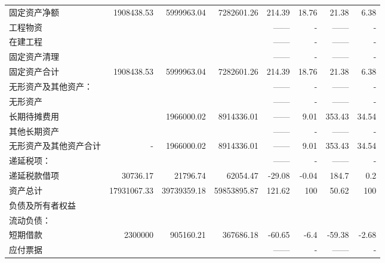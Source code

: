 \begin{longtable}{>{\scriptsize}p{9em}>{\scriptsize}r>{\scriptsize}r>{\scriptsize}r>{\scriptsize}r>{\scriptsize}r>{\scriptsize}r>{\scriptsize}r}
\hspace{2ex}	    固定资产净额	&	1908438.53	&	5999963.04	&	7282601.26	&	214.39	&	18.76	&	21.38	&	6.38	\\
\hspace{2ex}	    工程物资	&		&		&		&	——	&	- 	&	——	&	- 	\\
\hspace{2ex}	    在建工程	&		&		&		&	——	&	- 	&	——	&	- 	\\
\hspace{2ex}	    固定资产清理	&		&		&		&	——	&	- 	&	——	&	- 	\\
\hspace{2ex}	              固定资产合计	&	1908438.53	&	5999963.04	&	7282601.26	&	214.39	&	18.76	&	21.38	&	6.38	\\
\midrule
\hspace{2ex}	无形资产及其他资产：	&		&		&		&	——	&	- 	&	——	&	- 	\\
\hspace{2ex}	    无形资产	&		&		&		&	——	&	- 	&	——	&	- 	\\
\hspace{2ex}	    长期待摊费用	&		&	1966000.02	&	8914336.01	&	——	&	9.01	&	353.43	&	34.54	\\
\hspace{2ex}	    其他长期资产	&		&		&		&	——	&	- 	&	——	&	- 	\\
\hspace{2ex}	    无形资产及其他资产合计	&	- 	&	1966000.02	&	8914336.01	&	——	&	9.01	&	353.43	&	34.54	\\
\hspace{2ex}	递延税项：	&		&		&		&	——	&	- 	&	——	&	- 	\\
\hspace{2ex}	    递延税款借项	&	30736.17	&	21796.74	&	62054.47	&	-29.08	&	-0.04	&	184.7	&	0.2	\\
\hspace{2ex}	            资产总计	&	17931067.33	&	39739359.18	&	59853895.87	&	121.62	&	100	&	50.62	&	100	\\
\midrule	负债及所有者权益	&		&		&		&		&		&		&		\\
\hspace{2ex}	流动负债：	&		&		&		&		&		&		&		\\
\hspace{2ex}	    短期借款	&	2300000	&	905160.21	&	367686.18	&	-60.65	&	-6.4	&	-59.38	&	-2.68	\\
\hspace{2ex}	    应付票据	&		&		&		&	——	&	- 	&	——	&	- 	\\

\end{longtable}
